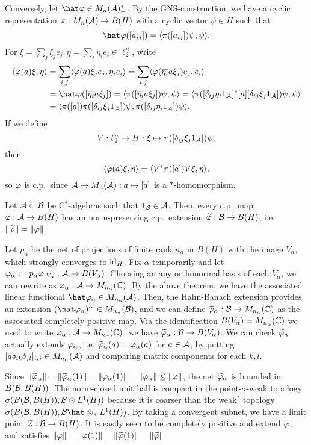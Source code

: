 \documentclass{../../small}
\begin{document}
\begin{pf}
Conversely, let $\hat\f\in M_n(\cA)^*_+$.
By the GNS-construction, we have a cyclic representation $\pi:M_n(\mathcal{A})\to B(H)$ with a cyclic vector $\psi\in H$ such that
\[\hat\f([a_{ij}])=\<\pi([a_{ij}])\psi,\psi\>.\]
For $\xi=\sum_j\xi_je_j,\eta=\sum_i\eta_ie_i\in\ell_2^n$, write
\begin{align*}
\<\f(a)\xi,\eta\>
&=\sum_{i,j}\<\f(a)\xi_je_j,\eta_ie_i\>
=\sum_{i,j}\<\f(\bar{\eta_i}a\xi_j)e_j,e_i\>\\
&=\hat\f([\bar{\eta_i}a\xi_j])
=\<\pi([\bar{\eta_i}a\xi_j])\psi,\psi\>
=\<\pi([\delta_{ij}\eta_i1_\cA]^*[a][\delta_{ij}\xi_j1_\cA])\psi,\psi\>\\
&=\<\pi([a])\pi([\delta_{ij}\xi_j1_\cA])\psi,\pi([\delta_{ij}\eta_i1_\cA])\psi\>.
\end{align*}
If we define
\[V:\ell_2^n\to H:\xi\mapsto\pi([\delta_{ij}\xi_j1_{\mathcal{A}}])\psi,\]
then
\[\langle\varphi(a)\xi,\eta\rangle=\langle V^*\pi([a])V\xi,\eta\rangle,\]
so $\varphi$ is c.p.~since $\mathcal{A}\to M_n(\mathcal{A}):a\mapsto[a]$ is a $*$-homomorphism.
\end{pf}

\begin{thm}
Let $\mathcal{A}\subset\mathcal{B}$ be C$^*$-algebras such that $1_{\mathcal{B}}\in\mathcal{A}$.
Then, every c.p.~map $\varphi:\mathcal{A}\to B(H)$ has an norm-preserving c.p.~extension $\widetilde{\varphi}:\mathcal{B}\to B(H)$, i.e. $\|\widetilde{\varphi}\|=\|\varphi\|$.
\end{thm}
\begin{pf}
Let $p_\alpha$ be the net of projections of finite rank $n_\alpha$ in $B(H)$ with the image $V_\alpha$, which strongly converges to $\operatorname{id}_H$.
Fix $\alpha$ temporarily and let $\varphi_\alpha:=p_\alpha\varphi|_{V_\alpha}:\mathcal{A}\to B(V_\alpha)$.
Choosing an any orthonormal basis of each $V_\alpha$, we can rewrite as $\varphi_\alpha:\mathcal{A}\to M_{n_\alpha}(\mathbb{C})$.
By the above theorem, we have the associated linear functional $\hat\f_\alpha\in M_{n_\alpha}(\cA)$.
Then, the Hahn-Banach extension provides an extension $(\hat\f_\alpha)^\sim\in M_{n_\alpha}(\cB)$, and we can define $\widetilde{\varphi}_\alpha:\mathcal{B}\to M_{n_\alpha}(\mathbb{C})$ as the associated completely positive map.
Via the identification $B(V_\alpha)=M_{n_\alpha}(\mathbb{C})$ we used to write $\varphi_\alpha:\mathcal{A}\to M_{n_\alpha}(\mathbb{C})$, we have $\widetilde{\varphi}_\alpha:\mathcal{B}\to B(V_\alpha)$.
We can check $\widetilde{\varphi}_\alpha$ actually extends $\varphi_\alpha$, i.e. $\widetilde{\varphi}_\alpha(a)=\varphi_\alpha(a)$ for $a\in\mathcal{A}$, by putting $[a\delta_{ik}\delta_{jl}]_{i,j}\in M_{n_\alpha}(\mathcal{A})$ and comparing matrix components for each $k,l$.

Since $\|\widetilde{\varphi}_\alpha\|=\|\widetilde{\varphi}_\alpha(1)\|=\|\varphi_\alpha(1)\|=\|\varphi_\alpha\|\le\|\varphi\|$, the net $\widetilde{\varphi}_\alpha$ is bounded in $B(\mathcal{B},B(H))$.
The norm-closed unit ball is compact in the point-$\sigma$-weak topology $\sigma(B(\mathcal{B},B(H)),\mathcal{B}\odot L^1(H))$ because it is coarser than the weak$^*$ topology $\sigma(B(\cB,B(H)),\cB\hat\otimes_\pi L^1(H))$.
By taking a convergent subnet, we have a limit point $\widetilde{\varphi}:\mathcal{B}\to B(H)$.
It is easily seen to be completely positive and extend $\varphi$, and satisfies $\|\varphi\|=\|\varphi(1)\|=\|\widetilde{\varphi}(1)\|=\|\widetilde{\varphi}\|$.
\end{pf}
\end{document}
